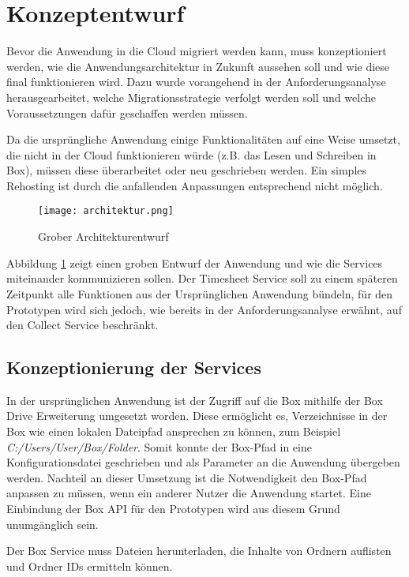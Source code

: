 \section{Konzeptentwurf}
Bevor die Anwendung in die Cloud migriert werden kann, muss konzeptioniert werden, wie die Anwendungsarchitektur in Zukunft aussehen soll und wie diese final funktionieren wird. Dazu wurde vorangehend in der Anforderungsanalyse herausgearbeitet, welche Migrationsstrategie verfolgt werden soll und welche Voraussetzungen dafür geschaffen werden müssen.

Da die ursprüngliche Anwendung einige Funktionalitäten auf eine Weise umsetzt, die nicht in der Cloud funktionieren würde (z.B. das Lesen und Schreiben in Box), müssen diese überarbeitet oder neu geschrieben werden. Ein simples Rehosting ist durch die anfallenden Anpassungen entsprechend nicht möglich.

\begin{figure}[H]
    \centering
    \texttt{[image: architektur.png]}
    \caption{Grober Architekturentwurf}
    \label{fig:Architektur}
\end{figure}

Abbildung \ref{fig:Architektur} zeigt einen groben  Entwurf der Anwendung und wie die Services miteinander kommunizieren sollen. Der Timesheet Service soll zu einem späteren Zeitpunkt alle Funktionen aus der Ursprünglichen Anwendung bündeln, für den Prototypen wird sich jedoch, wie bereits in der Anforderungsanalyse erwähnt, auf den Collect Service beschränkt.

\subsection{Konzeptionierung der Services}
In der ursprünglichen Anwendung ist der Zugriff auf die \gls{Box} mithilfe der Box Drive Erweiterung umgesetzt worden. Diese ermöglicht es, Verzeichnisse in der \gls{Box} wie einen lokalen Dateipfad ansprechen zu können, zum Beispiel \textit{C:/Users/User/Box/Folder}. Somit konnte der Box-Pfad in eine Konfigurationsdatei geschrieben und als Parameter an die Anwendung übergeben werden. Nachteil an dieser Umsetzung ist die Notwendigkeit den \gls{Box}-Pfad anpassen zu müssen, wenn ein anderer Nutzer die Anwendung startet. Eine Einbindung der \gls{Box} \ac{API} für den Prototypen wird aus diesem Grund unumgänglich sein.

Der \gls{Box} Service muss Dateien herunterladen, die Inhalte von Ordnern auflisten und Ordner IDs ermitteln können.

